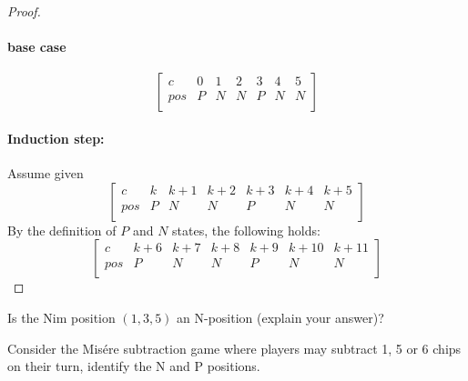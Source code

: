 \documentclass[addpoints,answers]{exam}
\begin{document}
\begin{questions}
\begin{solutionorbox}[\stretch{1}]
\begin{proof}
								\paragraph{base case}
							\[
							\begin{bmatrix}
								c   & 0 & 1 & 2 & 3 & 4 & 5 \\
								pos & P & N & N & P & N & N \\
							\end{bmatrix}
							\]

							\paragraph{Induction step:}Assume given 
							\[
							\begin{bmatrix}
								c   & k & k+1 & k+2 & k+3 & k+4 & k+5 \\
								pos & P & N & N & P & N & N \\
							\end{bmatrix}
							\]
							By the definition of $P$ and $N$ states, the following holds:
							\[
							\begin{bmatrix}
								c   & k+6 & k+7 & k+8 & k+9 & k+10 & k+11 \\
								pos & P & N & N & P & N & N \\
							\end{bmatrix}
							\]
							\end{proof}
            \end{solutionorbox}
            \newpage
 
        \question
            Is the Nim position $(1, 3, 5)$ an N-position (explain your answer)?
            \begin{solutionorbox}[\stretch{1}]
            \end{solutionorbox}
            \newpage
 
        \question
            Consider the Mis\'ere subtraction game where players may subtract 1, 5 or 6
            chips on their turn, identify the N and P positions.
            \begin{solutionorbox}[\stretch{1}]
            \end{solutionorbox}
            \newpage
 
\end{questions}
\end{document}
